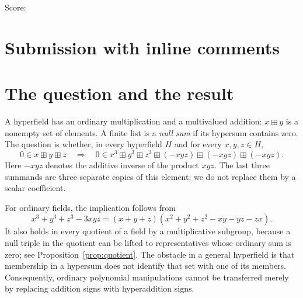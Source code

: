 \documentclass[11pt]{article}
\theoremstyle{remark}
\newcommand{\hs}{\boxplus}
\begin{document}
\noindent Score: 

\newpage
\section{Submission with inline comments}


\begin{abstract}
Over a field, a triple with sum zero satisfies the identity
$x^3+y^3+z^3=3xyz$. We show that the corresponding implication for
hyperaddition fails in general, even when the three copies of $-xyz$ are
kept as separate summands. We construct a countably infinite hyperfield
with infinite cyclic multiplicative group in which $(1,g,g^4)$ is a
counterexample. The construction uses translates of a subset of the
integers representing each nonzero integer uniquely as an ordered
difference. We prove the required incidence properties and all
hyperfield axioms directly. We also prove that the implication holds
for quotients of fields, for triples with a singleton pairwise
hypersum, and, under $-1=1$, for triples with equal squares.
\end{abstract}

\section{The question and the result}

A hyperfield has an ordinary multiplication and a multivalued addition:
$x\hs y$ is a nonempty set of elements. A finite list is a
\emph{null sum} if its hypersum contains zero. The question is whether,
in every hyperfield $H$ and for every $x,y,z\in H$,
\begin{equation}\label{eq:question}
 0\in x\hs y\hs z
 \quad\Longrightarrow\quad
 0\in x^3\hs y^3\hs z^3\hs(-xyz)\hs(-xyz)\hs(-xyz).
\end{equation}
Here $-xyz$ denotes the additive inverse of the product $xyz$.
The last three summands are three separate copies of this element;
we do not replace them by a scalar coefficient.

For ordinary fields, the implication follows from
\begin{equation}\label{eq:field-identity}
 x^3+y^3+z^3-3xyz
 =(x+y+z)(x^2+y^2+z^2-xy-yz-zx).
\end{equation}
It also holds in every quotient of a field by a multiplicative subgroup,
because a null triple in the quotient can be lifted to representatives
whose ordinary sum is zero; see Proposition~\ref{prop:quotient}.
The obstacle in a general hyperfield is that membership in a hypersum
does not identify that set with one of its members. Consequently,
ordinary polynomial manipulations cannot be transferred merely by
replacing addition signs with hyperaddition signs.
\end{document}

